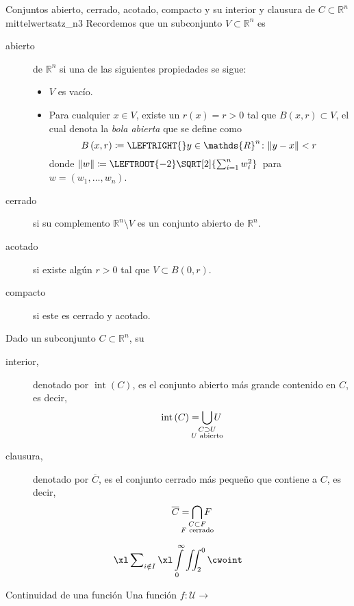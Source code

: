 \documentclass[a4paper,10pt]{article}
\begin{document}
\begin{YetAnotherDefinition}{Conjuntos abierto, cerrado, acotado, compacto y su interior y clausura de $C\subset\mathds{R}^{n}$}{mittelwertsatz_n3}%
	Recordemos que un subconjunto $V\subset\mathds{R}^{n}$ es
	\begin{description}
		\item[abierto] de $\mathds{R}^{n}$ si una de las siguientes propiedades se sigue:
		      \begin{itemize}
			      \item $V$ es vacío.
			      \item Para cualquier $x\in V$, existe un $r(x)=r>0$ tal que $B\left(x,r\right)\subset V$, el cual denota la \emph{bola abierta} que se define como \[ B\left(x,r\right)\coloneqq\LEFTRIGHT\{\}{y\in\mathds{R}^{n}\colon\|y-x\|<r\,} \]
			            donde $\|w\|\coloneqq\LEFTROOT{-2}\SQRT[2]{\sum_{i=1}^{n}w^{2}_{i}}\,$ para $w=\left(w_{1},\ldots,w_{n}\right)$.
		      \end{itemize}
		\item[cerrado] si su complemento $\mathds{R}^{n}\setminus V$ es un conjunto abierto de $\mathds{R}^{n}$.
		\item[acotado] si existe algún $r>0$ tal que $V\subset B\left(0,r\right)$.
		\item[compacto] si este es cerrado y acotado.
	\end{description}
	Dado un subconjunto $C\subset\mathds{R}^{n}$, su
	\begin{description}
		\item[interior,] denotado por $\operatorname{int}\left(C\right)$, es el conjunto abierto más grande contenido en $C$, es decir, \[ \operatorname{int}\left(C\right)=\bigcup_{\mathclap{\substack{C\supset U\\U\text{ abierto}}}} U \]
		\item[clausura,] denotado por $\overline{C}$, es el conjunto cerrado más pequeño que contiene a $C$, es decir, \[ \overline{C}=\bigcap_{\mathclap{\substack{C\subset F\\F\text{ cerrado}}}} F \]
	\end{description}
	\[  \xl\sum\nolimits_{i \notin I}\xl\int\limits_{0}^{\infty}\iint_{2}^{0}\cwoint \]
\end{YetAnotherDefinition}

\begin{YetAnotherDefinition}{Continuidad de una función}{}
	Una función $f\colon\mathcal{U}\rightarrow$
\end{YetAnotherDefinition}
\end{document}
